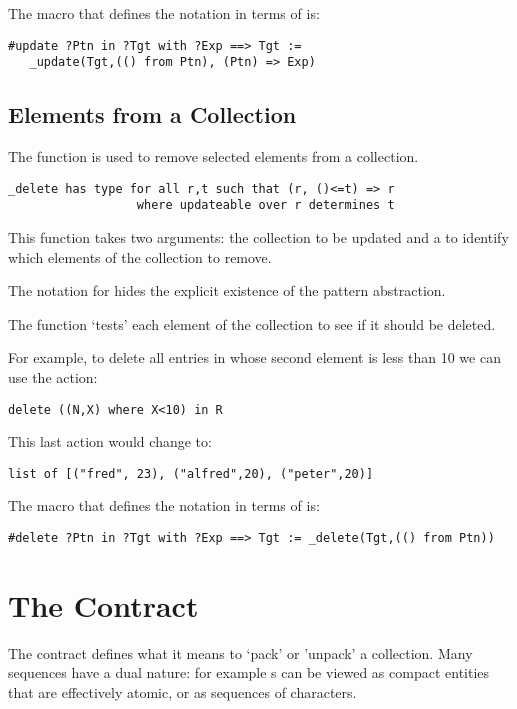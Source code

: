 The macro that defines the  notation in terms of  is:
\begin{lstlisting}
#update ?Ptn in ?Tgt with ?Exp ==> Tgt := 
   _update(Tgt,(() from Ptn), (Ptn) => Exp)
\end{lstlisting}


\subsection{ Elements from a Collection}
\label{delete}
The  function is used to remove selected elements from a collection.
\begin{lstlisting}
_delete has type for all r,t such that (r, ()<=t) => r
                  where updateable over r determines t
\end{lstlisting}
This function takes two arguments: the collection to be updated and a  to identify which elements of the collection to remove.

\begin{aside}
The  notation for  hides the explicit existence of the pattern abstraction.
\end{aside}

The  function `tests' each element of the collection to see if it should be deleted.

For example, to delete all entries in   whose second element is less than 10 we can use the action:
\begin{lstlisting}
delete ((N,X) where X<10) in R
\end{lstlisting}
This last action would change  to:
\begin{lstlisting}
list of [("fred", 23), ("alfred",20), ("peter",20)]
\end{lstlisting}

The macro that defines the  notation in terms of  is:
\begin{lstlisting}
#delete ?Ptn in ?Tgt with ?Exp ==> Tgt := _delete(Tgt,(() from Ptn))
\end{lstlisting}


\section{The  Contract}
\label{explosionContract}
The  contract defines what it means to `pack' or 'unpack' a collection. Many sequences have a dual nature: for example s can be viewed as compact entities that are effectively atomic, or as sequences of characters. 

